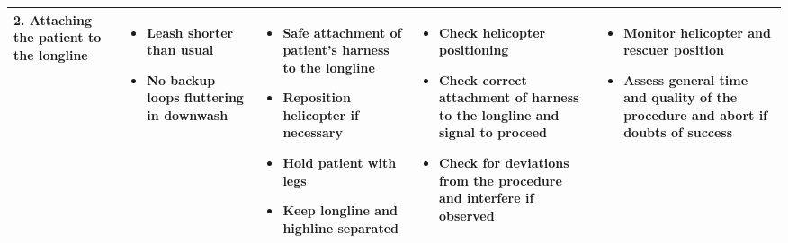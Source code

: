 \documentclass[a4paper,10pt]{scrartcl}
\begin{document}
\begin{landscape}
\begin{longtable}{|p{4cm}|p{4cm}|p{4cm}|p{4cm}|p{4cm}|}
 2. Attaching the patient to the longline &
 \begin{itemize}
    \item Leash shorter than usual
    \item No backup loops fluttering in downwash
  \end{itemize} & 
   \begin{itemize}
    \item Safe attachment of patient's harness to the longline
    \item Reposition helicopter if necessary
    \item Hold patient with legs
    \item Keep longline and highline separated
  \end{itemize} & 
   \begin{itemize}
    \item Check helicopter positioning
    \item Check correct attachment of harness to the longline and signal to proceed
    \item Check for deviations from the procedure and interfere if observed
  \end{itemize} & 
   \begin{itemize}
    \item Monitor helicopter and rescuer position
    \item Assess general time and quality of the procedure and abort if doubts of success
  \end{itemize} \\
  \hline
  

\end{longtable}
\end{landscape}
\end{document}
